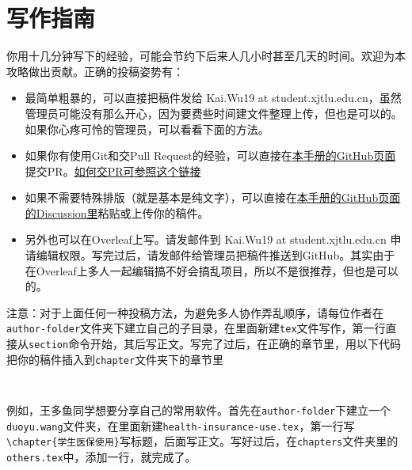 \chapter{写作指南}
\label{chapter.author-ins}


你用十几分钟写下的经验，可能会节约下后来人几小时甚至几天的时间。欢迎为本攻略做出贡献。正确的投稿姿势有：

\begin{itemize}
    \item 最简单粗暴的，可以直接把稿件发给 Kai.Wu19 at student.xjtlu.edu.cn，虽然管理员可能没有那么开心，因为要费些时间建文件整理上传，但也是可以的。如果你心疼可怜的管理员，可以看看下面的方法。
    \item 如果你有使用Git和交Pull Request的经验，可以直接在\href{https://github.com/kaiwu-astro/xp_pgrs_unofficial_guide}{本手册的GitHub页面}提交PR。\href{https://www.zhihu.com/question/21682976/answer/79489643}{如何交PR可参照这个链接}
    \item 如果不需要特殊排版（就是基本是纯文字），可以直接在\href{https://github.com/kaiwu-astro/xp_pgrs_unofficial_guide/discussions}{本手册的GitHub页面的Discussion里}粘贴或上传你的稿件。
    \item 另外也可以在Overleaf上写。请发邮件到 Kai.Wu19 at student.xjtlu.edu.cn 申请编辑权限。写完过后，请发邮件给管理员把稿件推送到GitHub。其实由于在Overleaf上多人一起编辑搞不好会搞乱项目，所以不是很推荐，但也是可以的。
\end{itemize} 

\vspace{5mm}
注意：对于上面任何一种投稿方法，为避免多人协作弄乱顺序，请每位作者在\texttt{author-folder}文件夹下建立自己的子目录，在里面新建\texttt{tex}文件写作，第一行直接从\texttt{section}命令开始，其后写正文。写完了过后，在正确的章节里，用以下代码把你的稿件插入到\texttt{chapter}文件夹下的章节里
\begin{lstlisting}
    
\end{lstlisting} 
例如，王多鱼同学想要分享自己的常用软件。首先在\texttt{author-folder}下建立一个\texttt{duoyu.wang}文件夹，在里面新建\texttt{health-insurance-use.tex}，第一行写\lstinline[breaklines=true]!\chapter{学生医保使用}!写标题，后面写正文。写好过后，在\texttt{chapters}文件夹里的\texttt{others.tex}中，添加一行\lstinline[breaklines=true]!!，就完成了。

